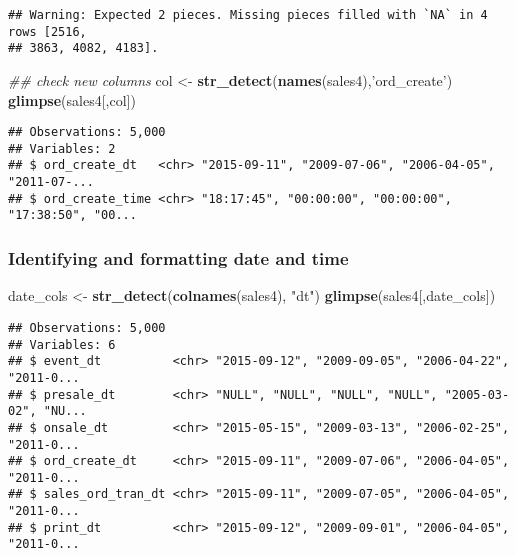 \documentclass[]{article}
\newenvironment{Shaded}{\begin{snugshade}}{\end{snugshade}}
\newcommand{\CommentTok}[1]{\textcolor[rgb]{0.56,0.35,0.01}{\textit{#1}}}
\newcommand{\KeywordTok}[1]{\textcolor[rgb]{0.13,0.29,0.53}{\textbf{#1}}}
\newcommand{\NormalTok}[1]{#1}
\newcommand{\StringTok}[1]{\textcolor[rgb]{0.31,0.60,0.02}{#1}}
\begin{document}
\begin{verbatim}
## Warning: Expected 2 pieces. Missing pieces filled with `NA` in 4 rows [2516,
## 3863, 4082, 4183].
\end{verbatim}

\begin{Shaded}
\begin{Highlighting}[]
\CommentTok{## check new columns}
\NormalTok{col <-}\StringTok{ }\KeywordTok{str_detect}\NormalTok{(}\KeywordTok{names}\NormalTok{(sales4),}\StringTok{'ord_create'}\NormalTok{)}
\KeywordTok{glimpse}\NormalTok{(sales4[,col])}
\end{Highlighting}
\end{Shaded}

\begin{verbatim}
## Observations: 5,000
## Variables: 2
## $ ord_create_dt   <chr> "2015-09-11", "2009-07-06", "2006-04-05", "2011-07-...
## $ ord_create_time <chr> "18:17:45", "00:00:00", "00:00:00", "17:38:50", "00...
\end{verbatim}

\hypertarget{identifying-and-formatting-date-and-time}{%
\subsubsection{Identifying and formatting date and
time}\label{identifying-and-formatting-date-and-time}}

\begin{Shaded}
\begin{Highlighting}[]
\NormalTok{date_cols <-}\StringTok{ }\KeywordTok{str_detect}\NormalTok{(}\KeywordTok{colnames}\NormalTok{(sales4), }\StringTok{"dt"}\NormalTok{)}
\KeywordTok{glimpse}\NormalTok{(sales4[,date_cols])}
\end{Highlighting}
\end{Shaded}

\begin{verbatim}
## Observations: 5,000
## Variables: 6
## $ event_dt          <chr> "2015-09-12", "2009-09-05", "2006-04-22", "2011-0...
## $ presale_dt        <chr> "NULL", "NULL", "NULL", "NULL", "2005-03-02", "NU...
## $ onsale_dt         <chr> "2015-05-15", "2009-03-13", "2006-02-25", "2011-0...
## $ ord_create_dt     <chr> "2015-09-11", "2009-07-06", "2006-04-05", "2011-0...
## $ sales_ord_tran_dt <chr> "2015-09-11", "2009-07-05", "2006-04-05", "2011-0...
## $ print_dt          <chr> "2015-09-12", "2009-09-01", "2006-04-05", "2011-0...
\end{verbatim}
\end{document}
